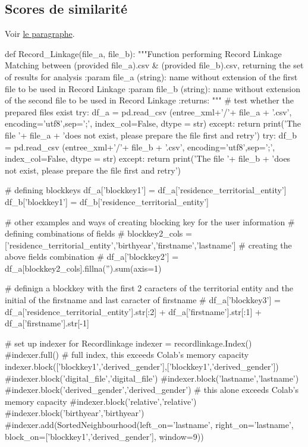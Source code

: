 \documentclass[a4paper,12pt,twoside]{book}
\begin{document}
    	    \subsection{Scores de similarité}
    	        Voir \hyperref[rl]{le paragraphe}.
    		    \label{rl_code}
    		    \begin{python}
def Record_Linkage(file_a, file_b):
  """Function performing Record Linkage Matching between (provided file_a).csv & (provided file_b).csv, returning the set of results for analysis
    :param file_a (string): name without extension of the first file to be used in Record Linkage
    :param file_b (string): name without extension of the second file to be used in Record Linkage
    :returns: 
  """
  # test whether the prepared files exist
  try:
    df_a = pd.read_csv (entree_xml+'/'+ file_a + '.csv', encoding='utf8',sep=';', index_col=False, dtype = str)
  except:
    return print('The file '+ file_a + 'does not exist, please prepare the file first and retry')
  try:
    df_b = pd.read_csv (entree_xml+'/'+ file_b + '.csv', encoding='utf8',sep=';', index_col=False, dtype = str)
  except:
    return print('The file '+ file_b + 'does not exist, please prepare the file first and retry')
  

  # defining blockkeys
  df_a['blockkey1'] = df_a['residence_territorial_entity']
  df_b['blockkey1'] = df_b['residence_territorial_entity']

  # other examples and ways of creating blocking key for the user information
  # defining combinations of fields
  # blockkey2_cols = ['residence_territorial_entity','birthyear','firstname','lastname']
  # creating the above fields combination
  # df_a['blockkey2'] = df_a[blockkey2_cols].fillna('').sum(axis=1)

  # definign a blockkey with the first 2 caracters of the territorial entity and the initial of the firstname and last caracter of firstname
  # df_a['blockkey3'] = df_a['residence_territorial_entity'].str[:2] + df_a['firstname'].str[:1] + df_a['firstname'].str[-1]
  
  # set up indexer for Recordlinkage
  indexer = recordlinkage.Index()
  #indexer.full() # full index, this exceeds Colab's memory capacity
  indexer.block(['blockkey1','derived_gender'],['blockkey1','derived_gender'])
  #indexer.block('digital_file','digital_file')
  #indexer.block('lastname','lastname')
  #indexer.block('derived_gender','derived_gender') # this alone exceeds Colab's memory capacity
  #indexer.block('relative','relative')
  #indexer.block('birthyear','birthyear')
  #indexer.add(SortedNeighbourhood(left_on='lastname', right_on='lastname', block_on=['blockkey1','derived_gender'], window=9))


\end{python}
\end{document}

